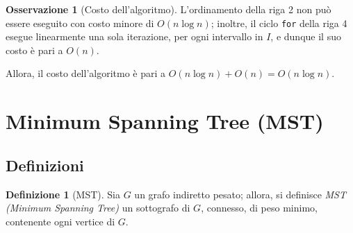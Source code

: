 \documentclass[14pt]{extreport}
\theoremstyle{definition}
\newtheorem{definition}{Definizione}[subsection]
\theoremstyle{definition}
\newtheorem{remark}{Osservazione}[subsection]
\begin{document}
\begin{remark}[Costo dell'algoritmo]
    L'ordinamento della riga 2 non può essere eseguito con costo minore di $O(n \log n)$; inoltre, il ciclo \texttt{for} della riga 4 esegue linearmente una sola iterazione, per ogni intervallo in $I$, e dunque il suo costo è pari a $O(n)$.

    Allora, il costo dell'algoritmo è pari a $O(n \log n) + O(n) = O(n \log n)$.
\end{remark}

\section{Minimum Spanning Tree (MST)}

\subsection{Definizioni}

\begin{definition}[MST]
    Sia $G$ un grafo indiretto pesato; allora, si definisce \textit{MST (Minimum Spanning Tree)} un sottografo di $G$, connesso, di peso minimo, contenente ogni vertice di $G$.
\end{definition}
\end{document}
